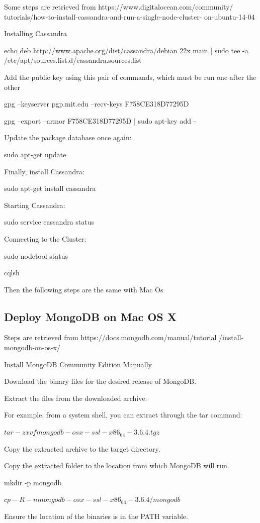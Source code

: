 Some steps are retrieved from https://www.digitalocean.com/community/
tutorials/how-to-install-cassandra-and-run-a-single-node-cluster-
on-ubuntu-14-04

Installing Cassandra

echo deb http://www.apache.org/dist/cassandra/debian 22x main | sudo tee -a 
/etc/apt/sources.list.d/cassandra.sources.list

Add the public key using this pair of commands, which must be run one
 after the other

gpg --keyserver pgp.mit.edu --recv-keys F758CE318D77295D

gpg --export --armor F758CE318D77295D | sudo apt-key add -

Update the package database once again:

	sudo apt-get update

Finally, install Cassandra:

	sudo apt-get install cassandra

Starting Cassandra:

sudo service cassandra status

Connecting to the Cluster:

sudo nodetool status

cqlsh

Then the following steps are the same with Mac Os

\subsection{Deploy MongoDB on Mac OS X}
Steps are retrieved from https://docs.mongodb.com/manual/tutorial
/install-mongodb-on-os-x/

Install MongoDB Community Edition Manually

Download the binary files for the desired release of MongoDB.


Extract the files from the downloaded archive.

For example, from a system shell, you can extract through the tar command:

$tar -zxvf mongodb-osx-ssl-x86_64-3.6.4.tgz$


Copy the extracted archive to the target directory.

Copy the extracted folder to the location from which MongoDB will run.

mkdir -p mongodb

$cp -R -n mongodb-osx-ssl-x86_64-3.6.4/ mongodb$

Ensure the location of the binaries is in the PATH variable.

